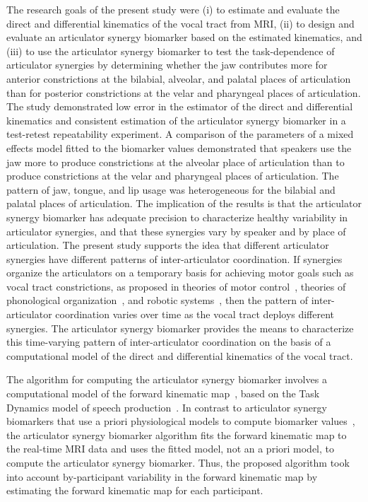 \documentclass[preprint]{JASAnew}\usepackage[]{graphicx}\usepackage[]{color}
\begin{document}
The research goals of the present study were (i) to estimate and evaluate the direct and differential kinematics of the vocal tract from MRI, 
%
(ii) to design and evaluate an articulator synergy biomarker based on the estimated kinematics, and
%
(iii) to use the articulator synergy biomarker to test the task-dependence of articulator synergies by determining whether the jaw contributes more for anterior constrictions at the bilabial, alveolar, and palatal places of articulation than for posterior constrictions at the velar and pharyngeal places of articulation.
%
The study demonstrated low error in the estimator of the direct and differential kinematics and consistent estimation of the articulator synergy biomarker in a test-retest repeatability experiment.
%
A comparison of the parameters of a mixed effects model fitted to the biomarker values demonstrated that speakers use the jaw more to produce constrictions at the alveolar place of articulation than to produce constrictions at the velar and pharyngeal places of articulation. 
%
The pattern of jaw, tongue, and lip usage was heterogeneous for the bilabial and palatal places of articulation.
%
The implication of the results is that the articulator synergy biomarker has adequate precision to characterize healthy variability in articulator synergies, and that these synergies vary by speaker and by place of articulation. 
%
The present study supports the idea that different articulator synergies have different patterns of inter-articulator coordination. 
If synergies organize the articulators on a temporary basis for achieving motor goals such as vocal tract constrictions, as proposed in theories of motor control~\citep{turvey1977preliminaries, saltzman1987skilled}, theories of phonological organization~\citep{browman1986towards, browman1989articulatory}, and robotic systems~\citep{herbort2010sure}, then the pattern of inter-articulator coordination varies over time as the vocal tract deploys different synergies. 
The articulator synergy biomarker provides the means to characterize this time-varying pattern of inter-articulator coordination on the basis of a computational model of the direct and differential kinematics of the vocal tract. 

The algorithm for computing the articulator synergy biomarker involves a computational model of the forward kinematic map~\citep{lammert2013statistical}, based on the Task Dynamics model of speech production~\citep{saltzman1989dynamical}. In contrast to articulator synergy biomarkers that use a priori physiological models to compute biomarker values~\citep[e.g., articulator synergy biomarkers of kinetic parameters from dynamic contrast-enhanced MRI,][]{aerts2008system},  the articulator synergy biomarker algorithm fits the forward kinematic map to the real-time MRI data and uses the fitted model, not an a priori model, to compute the articulator synergy biomarker. Thus, the proposed algorithm took into account by-participant variability in the forward kinematic map by estimating the forward kinematic map for each participant. 
\end{document}
